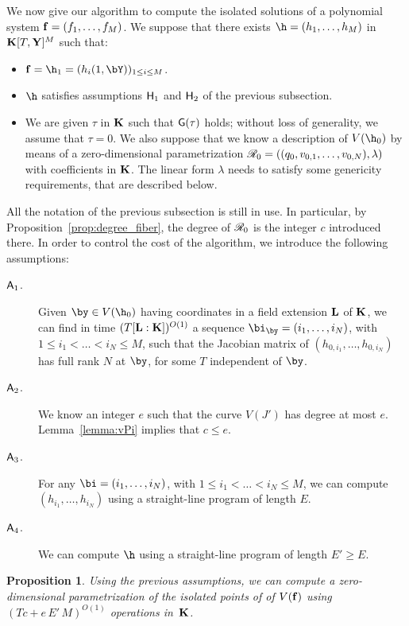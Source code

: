 \documentclass[12pt]{article}
\newtheorem{proposition}[definition]{Proposition}
\begin{document}
We now give our algorithm to compute the isolated solutions of a
polynomial system $\mathbf{f}=(f_1,\dots,f_M)$. We suppose that there exists
$\h=(h_1,\dots,h_M)$ in $\mathbf{K}[T,\mathbf{Y}]^M$ such that:
\begin{itemize}
\item $\f=\h_1=(h_i(1,\bY))_{1 \le i \le M}$.
\item $\h$ satisfies assumptions ${\sf H}_1$ and ${\sf H}_2$ of the previous subsection.
\item We are given $\tau$ in $\mathbf{K}$ such that ${\sf G}(\tau)$ holds;
  without loss of generality, we assume that $\tau=0$. We also 
  suppose that we know a description of $V(\h_{0})$ by means of a
  zero-dimensional parametrization
  $\mathscr{R}_{0}=((q_{0},v_{0,1},\dots,v_{0,N}),\lambda)$ with
  coefficients in $\mathbf{K}$. The linear form $\lambda$ needs to satisfy 
  some genericity requirements, that are described below.
\end{itemize}
All the notation of the previous subsection is still in use. In
particular, by Proposition~\ref{prop:degree_fiber}, the degree of
$\mathscr{R}_{0}$ is the integer $c$ introduced there. In order to control
the cost of the algorithm, we introduce the following assumptions:
\begin{description}
\item[${\sf A}_1$.] Given $\by \in V(\h_0)$ having coordinates in a field
  extension $\mathbf{L}$ of $\mathbf{K}$, we can find in time $(T
  [\mathbf{L}:\mathbf{K}])^{O(1)}$ a sequence $\bi_\by=(i_1,\dots,i_N)$, with
$1 \le i_1 < \dots < i_N \le M$, such that the
  Jacobian matrix of $(h_{0,i_1},\dots,h_{0,{i_N}})$ has full
  rank $N$ at $\by$, for some $T$ independent of $\by$.
\item[${\sf A}_2$.] We know an integer $e$ such that the curve $V(J')$
  has degree at most $e$. Lemma~\ref{lemma:vPi} implies that 
  $c \le e$.
\item[${\sf A}_3$.] For any $\bi=(i_1,\dots,i_N)$, with $1 \le i_1 <
  \dots < i_N \le M$, we can compute $(h_{i_1},\dots,h_{{i_N}})$ using
  a straight-line program of length $E$.
\item[${\sf A}_4$.] We can compute $\h$ using a straight-line program
  of length $E' \ge E$.
\end{description}

\begin{proposition}\label{prop:compute_isolated}
  Using the previous assumptions, we can compute a zero-dimensional
  parametrization of the isolated points of 
 of $V(\mathbf{f})$ using $(T c + e\,E'\,M)^{O(1)}$ operations in~$\mathbf{K}$.
\end{proposition}
\end{document}
